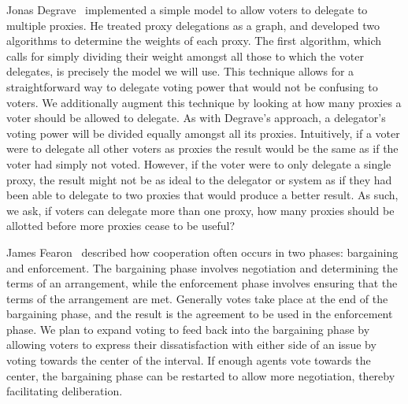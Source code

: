Jonas Degrave~\cite{Degrave2014} implemented a simple model to allow voters to
delegate to multiple proxies.
He treated proxy delegations as a graph, and developed two algorithms to determine
the weights of each proxy.
The first algorithm, which calls for simply dividing their weight amongst all those
to which the voter delegates, is precisely the model we will use.
This technique allows for a straightforward way to delegate voting power that would
not be confusing to voters.
We additionally augment this technique by looking at how many proxies a voter should be
allowed to delegate.
As with Degrave's approach, a delegator's voting power will be divided equally amongst
all its proxies.
Intuitively, if a voter were to delegate all other voters as proxies the result would
be the same as if the voter had simply not voted.
However, if the voter were to only delegate a single proxy, the result might not be
as ideal to the delegator or system as if they had been able to delegate to two proxies
that would produce a better result.
As such, we ask, if voters can delegate more than one proxy, how many proxies should
be allotted before more proxies cease to be useful?

James Fearon~\cite{Fearon1998} described how cooperation often occurs in two phases:
bargaining and enforcement.
The bargaining phase involves negotiation and determining the terms of an arrangement,
while the enforcement phase involves ensuring that the terms of the arrangement are met.
Generally votes take place at the end of the bargaining phase, and the result is the
agreement to be used in the enforcement phase.
We plan to expand voting to feed back into the bargaining phase by allowing voters to
express their dissatisfaction with either side of an issue by voting towards the
center of the interval.
If enough agents vote towards the center, the bargaining phase can be restarted to
allow more negotiation, thereby facilitating deliberation.




